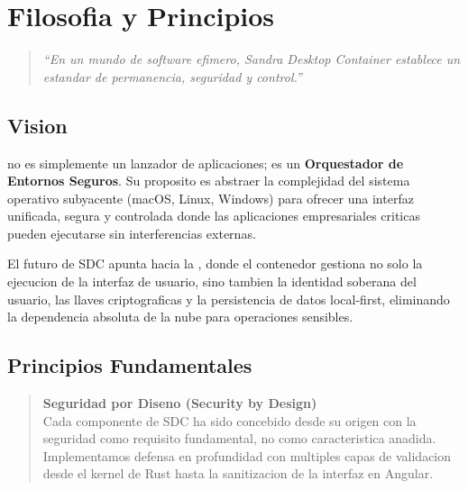 
\chapter*{Filosofia y Principios}

\begin{quote}
\textit{``En un mundo de software efimero, Sandra Desktop Container establece un estandar de permanencia, seguridad y control.''}
\end{quote}

\section*{Vision}

\sdc{} no es simplemente un lanzador de aplicaciones; es un \textbf{Orquestador de Entornos Seguros}. Su proposito es abstraer la complejidad del sistema operativo subyacente (macOS, Linux, Windows) para ofrecer una interfaz unificada, segura y controlada donde las aplicaciones empresariales criticas pueden ejecutarse sin interferencias externas.

El futuro de SDC apunta hacia la , donde el contenedor gestiona no solo la ejecucion de la interfaz de usuario, sino tambien la identidad soberana del usuario, las llaves criptograficas y la persistencia de datos local-first, eliminando la dependencia absoluta de la nube para operaciones sensibles.

\section*{Principios Fundamentales}

\begin{quote}
\textbf{Seguridad por Diseno (Security by Design)}\\
\small
Cada componente de SDC ha sido concebido desde su origen con la seguridad como requisito fundamental, no como caracteristica anadida. Implementamos defensa en profundidad con multiples capas de validacion desde el kernel de Rust hasta la sanitizacion de la interfaz en Angular.
\end{quote}

